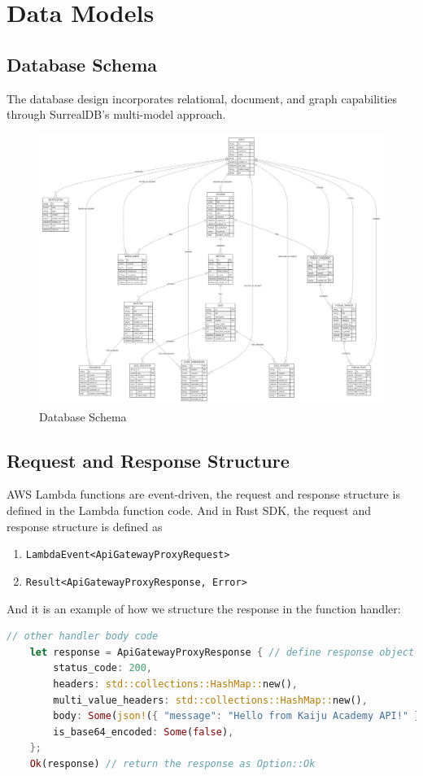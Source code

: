 \documentclass[a4paper, 11pt]{scrreprt}
\begin{document}
\chapter{Data Models}

\section{Database Schema}
The database design incorporates relational, document, and graph capabilities through SurrealDB's multi-model approach.

\begin{figure}[!ht]
    \centering
    \includegraphics[width=\textwidth]{database_schema.png}
    \caption{Database Schema}
\end{figure}

\section{Request and Response Structure}
AWS Lambda functions are event-driven, the request and response structure is defined in the Lambda function code. And in Rust SDK, the 
request and response structure is defined as
\begin{enumerate}
    \item \texttt{LambdaEvent<ApiGatewayProxyRequest>}
    \item \texttt{Result<ApiGatewayProxyResponse, Error>}
\end{enumerate}
And it is an example of how we structure the response in the function handler:
\begin{lstlisting}[language=Rust]
    // other handler body code
    let response = ApiGatewayProxyResponse { // define response object
        status_code: 200,
        headers: std::collections::HashMap::new(),
        multi_value_headers: std::collections::HashMap::new(),
        body: Some(json!({ "message": "Hello from Kaiju Academy API!" }).to_string()),
        is_base64_encoded: Some(false),
    };
    Ok(response) // return the response as Option::Ok
\end{lstlisting}
\end{document}
